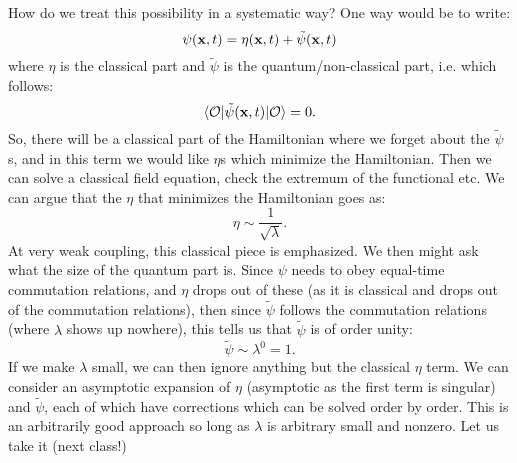 How do we treat this possibility in a systematic way? One way would be to write:
\begin{equation}
    \psi(\mathbf{x}, t) = \eta(\mathbf{x}, t) + \tilde{\psi}(\mathbf{x}, t)
\end{equation}
where $\eta$ is the classical part and $\tilde{\psi}$ is the quantum/non-classical part, i.e. which follows:
\begin{equation}
    \langle \mathcal{O} \rvert\tilde{\psi}(\mathbf{x}, t)\lvert \mathcal{O} \rangle = 0.
\end{equation}
So, there will be a classical part of the Hamiltonian where we forget about the $\tilde{\psi}$s, and in this term we would like $\eta$s which minimize the Hamiltonian. Then we can solve a classical field equation, check the extremum of the functional etc. We can argue that the $\eta$ that minimizes the Hamiltonian goes as:
\begin{equation}
    \eta \sim \frac{1}{\sqrt{\lambda}}.
\end{equation}
At very weak coupling, this classical piece is emphasized. We then might ask what the size of the quantum part is. Since $\psi$ needs to obey equal-time commutation relations, and $\eta$ drops out of these (as it is classical and drops out of the commutation relations), then since $\tilde{\psi}$ follows the commutation relations (where $\lambda$ shows up nowhere), this tells us that $\tilde{\psi}$ is of order unity:
\begin{equation}
    \tilde{\psi} \sim \lambda^0 = 1.
\end{equation}
If we make $\lambda$ small, we can then ignore anything but the classical $\eta$ term. We can consider an asymptotic expansion of $\eta$ (asymptotic as the first term is singular) and $\tilde{\psi}$, each of which have corrections which can be solved order by order. This is an arbitrarily good approach so long as $\lambda$ is arbitrary small and nonzero. Let us take it (next class!)

